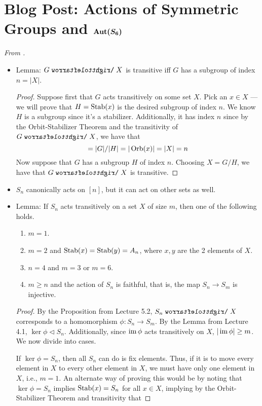 \documentclass[../notes.tex]{subfiles}
\begin{document}
\section[Blog Post: Actions of Symmetric Groups and \texorpdfstring{$\Aut(S_6)$}{TEXT}]{Blog Post: Actions of Symmetric Groups and \texorpdfstring{$\bm{\Aut(S_6)}$}{TEXT}}
\emph{From \textcite{bib:Calegari}.}
\begin{itemize}
    \item {}Lemma: $G\acts X$ is transitive iff $G$ has a subgroup of index $n=|X|$.
    \begin{proof}
        Suppose first that $G$ acts transitively on some set $X$. Pick an $x\in X$ --- we will prove that $H=\operatorname{Stab}(x)$ is the desired subgroup of index $n$. We know $H$ is a subgroup since it's a stabilizer. Additionally, it has index $n$ since by the Orbit-Stabilizer Theorem and the transitivity of $G\acts X$, we have that
        \begin{equation*}
            [G:H] = |G|/|H| 
            = |\Orb(x)|
            = |X|
            = n
        \end{equation*}
        Now suppose that $G$ has a subgroup $H$ of index $n$. Choosing $X=G/H$, we have that $G\acts X$ is transitive.
    \end{proof}
    \item $S_n$ canonically acts on $[n]$, but it can act on other sets as well.
    \item Lemma: If $S_n$ acts transitively on a set $X$ of size $m$, then one of the following holds.
    \begin{enumerate}
        \item $m=1$.
        \item $m=2$ and $\operatorname{Stab}(x)=\operatorname{Stab}(y)=A_n$, where $x,y$ are the 2 elements of $X$.
        \item $n=4$ and $m=3$ or $m=6$.
        \item $m\geq n$ and the action of $S_n$ is faithful, that is, the map $S_n\to S_m$ is injective.
    \end{enumerate}
    \begin{proof}
        By the Proposition from Lecture 5.2, $S_n\acts X$ corresponds to a homomorphism $\phi:S_n\to S_m$. By the Lemma from Lecture 4.1, $\ker\phi\triangleleft S_n$. Additionally, since $\operatorname{im}\phi$ acts transitively on $X$, $|\operatorname{im}\phi|\geq m$. We now divide into cases.\par
        If $\ker\phi=S_n$, then all $S_n$ can do is fix elements. Thus, if it is to move every element in $X$ to every other element in $X$, we must have only one element in $X$, i.e., $m=1$. An alternate way of proving this would be by noting that $\ker\phi=S_n$ implies $\operatorname{Stab}(x)=S_n$ for all $x\in X$, implying by the Orbit-Stabilizer Theorem and transitivity that

\end{proof}
\end{itemize}
\end{document}
